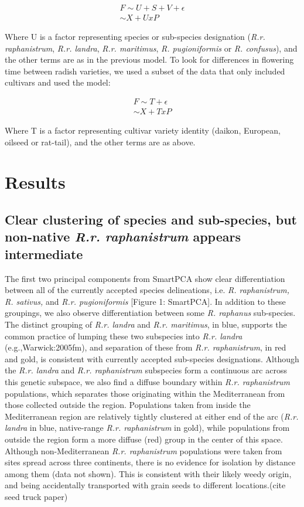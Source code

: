 \documentclass[twocolumn]{bmcart}%
\begin{document}
\begin{gather*}
	F \sim U + S + V + \epsilon \\
	\sim X + U x P
\end{gather*}


Where U is a factor representing species or sub-species designation (\textit{R.r. raphanistrum}, \textit{R.r. landra}, \textit{R.r. maritimus}, \textit{R. pugioniformis} or \textit{R. confusus}), and the other terms are as in the previous model.
To look for differences in flowering time between radish varieties, we used a subset of the data that only included cultivars and used the model:

\begin{gather*}
	F \sim T + \epsilon \\
  \sim X + T x P
\end{gather*}

Where T is a factor representing cultivar variety identity (daikon, European, oilseed or rat-tail), and the other terms are as above.

\section*{Results} 

\subsection*{Clear clustering of species and sub-species, but non-native \textit{R.r. raphanistrum} appears intermediate}

The first two principal components from SmartPCA show clear differentiation between all of the currently accepted species delineations, i.e. \textit{R. raphanistrum, R. sativus,} and \textit{R.r. pugioniformis} [Figure 1: SmartPCA]. In addition to these groupings, we also observe differentiation between some \textit{R. raphanus} sub-species. The distinct grouping of \textit{R.r. landra} and \textit{R.r. maritimus}, in blue, supports the common practice of lumping these two subspecies into \textit{R.r. landra} (e.g.,{Warwick:2005fm}), and separation of these from \textit{R.r. raphanistrum}, in red and gold, is consistent with currently accepted sub-species designations. Although the \textit{R.r. landra} and \textit{R.r. raphanistrum} subspecies form a continuous arc across this genetic subspace, we also find a diffuse boundary within \textit{R.r. raphanistrum} populations, which separates those originating within the Mediterranean from those collected outside the region. Populations taken from inside the Mediterranean region are relatively tightly clustered at either end of the arc (\textit{R.r. landra} in blue, native-range \textit{R.r. raphanistrum} in gold), while populations from outside the region form a more diffuse (red) group in the center of this space. Although non-Mediterranean \textit{R.r. raphanistrum} populations were taken from sites spread across three continents, there is no evidence for isolation by distance among them (data not shown). This is consistent with their likely weedy origin, and being accidentally transported with grain seeds to different locations.(cite seed truck paper)
\end{document}
